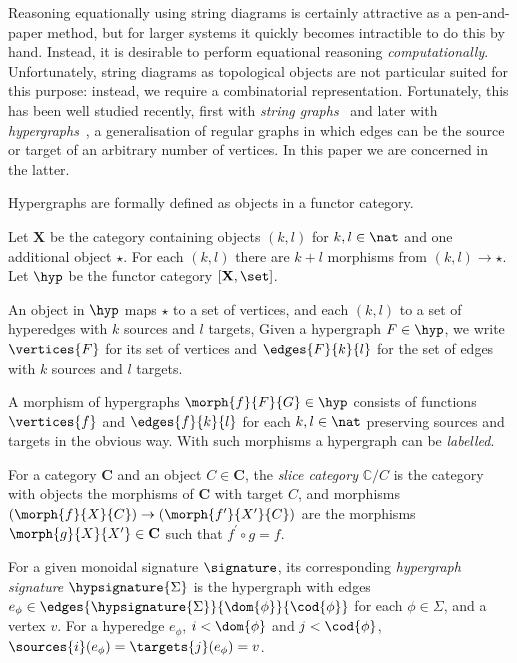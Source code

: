 Reasoning equationally using string diagrams is certainly attractive
as a pen-and-paper method, but for larger systems it quickly becomes intractible
to do this by hand.
Instead, it is desirable to perform equational reasoning \emph{computationally}.
Unfortunately, string diagrams as topological objects are not particular suited
for this purpose: instead, we require a combinatorial representation.
Fortunately, this has been well studied
recently, first with
\emph{string graphs}~\cite{dixon2013opengraphs,kissinger2012pictures}
and later with
\emph{hypergraphs}~\cite{bonchi2022string,bonchi2021string,bonchi2022stringa},
a generalisation of regular graphs in which edges can be the source or target of
an arbitrary number of vertices.
In this paper we are concerned in the latter.

Hypergraphs are formally defined as objects in a functor category.

\begin{definition}[Hypergraph]
    Let \(\mathbf{X}\) be the category containing objects \((k, l)\) for
    \(k, l \in \nat\) and one additional object \(\star\).
    For each \((k, l)\) there are \(k + l\) morphisms from \((k, l) \to \star\).
    Let \(\hyp\) be the functor category \([\mathbf{X},\set]\).
\end{definition}

An object in \(\hyp\) maps \(\star\) to a set of vertices, and each \((k,l)\) to
a set of hyperedges with \(k\) sources and \(l\) targets,
Given a hypergraph \(F \in \hyp\), we write \(\vertices{F}\) for its set of
vertices and \(\edges{F}{k}{l}\) for the set of edges with \(k\) sources and
\(l\) targets.

A morphism of hypergraphs \(\morph{f}{F}{G} \in \hyp\) consists of functions
\(\vertices{f}\) and \(\edges{f}{k}{l}\) for each \(k,l \in \nat\) preserving
sources and targets in the obvious way.
With such morphisms a hypergraph can be \emph{labelled}.

\begin{definition}
    For a category \(\mathbf{C}\) and an object \(C \in \mathbf{C}\), the
    \emph{slice category} \(\mathbb{C} / C\) is the category with objects the
    morphisms of \(\mathbf{C}\) with target \(C\), and morphisms \(
        (\morph{f}{X}{C}) \to (\morph{f^\prime}{X^\prime}{C})
    \) are the morphisms \(\morph{g}{X}{X^\prime} \in \mathbf{C}\) such that
    \(f^\prime \circ g = f\).
\end{definition}


\begin{definition}
    For a given monoidal signature \(\signature\), its corresponding
    \emph{hypergraph signature} \(\hypsignature{\Sigma}\) is the hypergraph with
    edges \(
        e_\phi \in \edges{\hypsignature{\Sigma}}{\dom{\phi}}{\cod{\phi}}
    \) for each \(\phi \in \Sigma\), and a vertex \(v\).
    For a hyperedge \(e_\phi\), \(i < \dom{\phi}\) and \(j < \cod{\phi}\), \(
        \sources{i}(e_\phi) = \targets{j}(e_\phi) = v
    \).
\end{definition}

